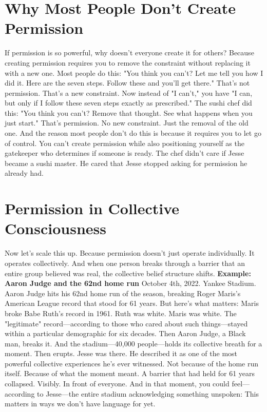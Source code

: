\section{Why Most People Don't Create Permission}

If permission is so powerful, why doesn't everyone create it for others?
Because creating permission requires you to remove the constraint without replacing it with a new one.
Most people do this:
"You think you can't? Let me tell you how I did it. Here are the seven steps. Follow these and you'll get there."
That's not permission. That's a new constraint.
Now instead of "I can't," you have "I can, but only if I follow these seven steps exactly as prescribed."
The sushi chef did this:
"You think you can't? Remove that thought. See what happens when you just start."
That's permission. No new constraint. Just the removal of the old one.
And the reason most people don't do this is because it requires you to let go of control. You can't create permission while also positioning yourself as the gatekeeper who determines if someone is ready.
The chef didn't care if Jesse became a sushi master. He cared that Jesse stopped asking for permission he already had.

\section{Permission in Collective Consciousness}

Now let's scale this up.
Because permission doesn't just operate individually. It operates collectively. And when one person breaks through a barrier that an entire group believed was real, the collective belief structure shifts.
\textbf{Example: Aaron Judge and the 62nd home run}
October 4th, 2022. Yankee Stadium. Aaron Judge hits his 62nd home run of the season, breaking Roger Maris's American League record that stood for 61 years.
But here's what matters: Maris broke Babe Ruth's record in 1961.
Ruth was white. Maris was white. The "legitimate" record—according to those who cared about such things—stayed within a particular demographic for six decades.
Then Aaron Judge, a Black man, breaks it.
And the stadium—40,000 people—holds its collective breath for a moment. Then erupts.
Jesse was there. He described it as one of the most powerful collective experiences he's ever witnessed. Not because of the home run itself. Because of what the moment meant.
A barrier that had held for 61 years collapsed. Visibly. In front of everyone.
And in that moment, you could feel—according to Jesse—the entire stadium acknowledging something unspoken: This matters in ways we don't have language for yet.

